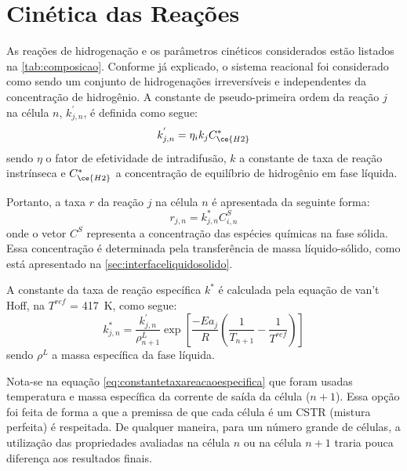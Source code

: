 \section{Cinética das Reações} \label{sec:cineticadasreacoes}

As reações de hidrogenação e os parâmetros cinéticos considerados estão
listados na \autoref{tab:composicao}. Conforme já explicado, o sistema reacional
foi considerado como sendo um conjunto de hidrogenações irreversíveis e
independentes da concentração de hidrogênio. A constante de pseudo-primeira
ordem da reação $j$ na célula $n$, $k^{'}_{j,n}$, é definida como segue:
\begin{equation}
k^{'}_{j,n} = \eta_ik_jC^{*}_{\ce{H2}}
\label{eq:constantepseudoprimeiraordem}
\end{equation}
sendo $\eta$ o fator de efetividade de intradifusão, $k$ a
constante de taxa de reação instrínseca e $C^{*}_{\ce{H2}}$ a concentração de
equilíbrio de hidrogênio em fase líquida.


Portanto, a taxa $r$ da reação $j$ na célula $n$ é apresentada da seguinte
forma:
\begin{equation}
r_{j,n} = k^{*}_{j,n}C^{S}_{i,n}
\label{eq:taxareacao}
\end{equation}
onde o vetor $C^{S}$ representa a concentração das espécies químicas na fase
sólida. Essa concentração é determinada pela transferência de massa
líquido-sólido, como está apresentado na \autoref{sec:interfaceliquidosolido}.

A constante da taxa de reação específica $k^{*}$ é calculada pela
equação de van't Hoff, na $T^{ref}$ = \SI{417}{K}, como segue:
\begin{equation}
k^{*}_{j,n} = \dfrac{k^{'}_{j,n}} {\rho^{L}_{n+1}} \exp
\left[{\dfrac{-Ea_j}{R} \left (\dfrac{1}{T_{n+1}} -
\dfrac{1}{T^{ref}} \right )}\right]
\label{eq:constantetaxareacaoespecifica}
\end{equation}
sendo $\rho^L$ a massa específica da fase líquida.

Nota-se na equação \autoref{eq:constantetaxareacaoespecifica} que foram usadas
temperatura e massa específica da corrente de saída da célula ($n+1$).
Essa opção foi feita de forma a que a premissa de que cada célula
é um CSTR (mistura perfeita) é respeitada.
De qualquer maneira, para um número grande de células, a utilização das propriedades
avaliadas na célula $n$ ou na célula $n+1$ traria pouca diferença aos resultados
finais.

